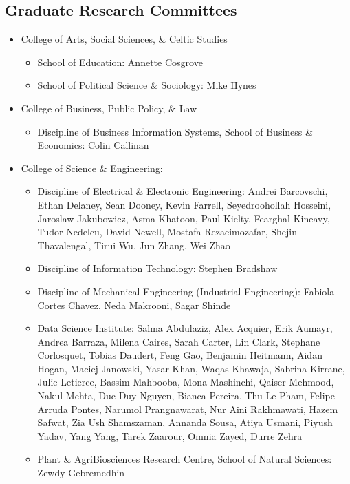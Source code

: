 \documentclass[10pt,a4paper]{res} %
\begin{document}
\begin{resume}
\subsection*{Graduate Research Committees}

\begin{itemize} \itemsep -2pt
\item College of Arts, Social Sciences, \& Celtic Studies
\begin{itemize}
\item School of Education: Annette Cosgrove
\item School of Political Science \& Sociology: Mike Hynes
\end{itemize}
\item College of Business, Public Policy, \& Law
\begin{itemize}
\item Discipline of Business Information Systems, School of Business \& Economics: Colin Callinan
\end{itemize}
\item College of Science \& Engineering:
\begin{itemize}
\item Discipline of Electrical \& Electronic Engineering: Andrei Barcovschi, Ethan Delaney, Sean Dooney, Kevin Farrell, Seyedroohollah Hosseini, Jaroslaw Jakubowicz, Asma Khatoon, Paul Kielty, Fearghal Kineavy, Tudor Nedelcu, David Newell, Mostafa Rezaeimozafar, Shejin Thavalengal, Tirui Wu, Jun Zhang, Wei Zhao
\item Discipline of Information Technology: Stephen Bradshaw
\item Discipline of Mechanical Engineering (Industrial Engineering): Fabiola Cortes Chavez, Neda Makrooni, Sagar Shinde
\item Data Science Institute: Salma Abdulaziz, Alex Acquier, Erik Aumayr, Andrea Barraza, Milena Caires, Sarah Carter, Lin Clark, Stephane Corlosquet, Tobias Daudert, Feng Gao, Benjamin Heitmann, Aidan Hogan, Maciej Janowski, Yasar Khan, Waqas Khawaja, Sabrina Kirrane, Julie Letierce, Bassim Mahbooba, Mona Mashinchi, Qaiser Mehmood, Nakul Mehta, Duc-Duy Nguyen, Bianca Pereira, Thu-Le Pham, Felipe Arruda Pontes, Narumol Prangnawarat, Nur Aini Rakhmawati, Hazem Safwat, Zia Ush Shamszaman, Annanda Sousa, Atiya Usmani, Piyush Yadav, Yang Yang, Tarek Zaarour, Omnia Zayed, Durre Zehra
\item Plant \& AgriBiosciences Research Centre, School of Natural Sciences: Zewdy Gebremedhin
\end{itemize}
\end{itemize}


\end{resume}
\end{document}
